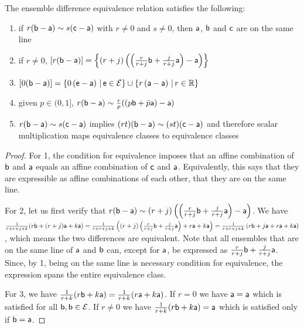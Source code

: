 \begin{mathSection}
	\begin{prop}\label{pm_es_ensDiffProps}
		The ensemble difference equivalence relation satisfies the following:
		\begin{enumerate}
			\item if $r(\ens[b] - \ens[a]) \sim s(\ens[c] - \ens[a])$ with $r\neq0$ and $s\neq0$, then $\ens[a]$, $\ens[b]$ and $\ens[c]$ are on the same line
			\item if $r\neq0$, $[r(\ens[b] - \ens[a])] = \left\{(r+j)\left(\left(\frac{r}{r+j}\ens[b] +\frac{j}{r+j} \ens[a]\right) -\ens[a]\right)\right\}$
			\item $\left[0(\ens[b] - \ens[a])\right] = \left\{0\left(\ens - \ens[a]\right) \, | \, \ens \in \Ens \right\} \cup \left\{r\left(\ens[a] - \ens[a]\right) \, | \, r \in \mathbb{R} \right\}$
			\item given $p \in (0,1]$, $r(\ens[b] - \ens[a]) \sim \frac{r}{p}((p\ens[b] + \bar{p}\ens[a]) - \ens[a])$
			\item $r(\ens[b] - \ens[a]) \sim s(\ens[c] - \ens[a])$ implies $(rt)(\ens[b] - \ens[a]) \sim (st)(\ens[c] - \ens[a])$ and therefore scalar multiplication maps equivalence classes to equivalence classes
		\end{enumerate}
	\end{prop}
	
	\begin{proof}
		For 1, the condition for equivalence imposes that an affine combination of $\ens[b]$ and $\ens[a]$ equals an affine combination of $\ens[c]$ and $\ens[a]$. Equivalently, this says that they are expressible as affine combinations of each other, that they are on the same line.
		
		For 2, let us first verify that $r(\ens[b] - \ens[a]) \sim (r+j)\left(\left(\frac{r}{r+j}\ens[b] +\frac{j}{r+j} \ens[a]\right) -\ens[a]\right)$. We have $\frac{1}{r+r+j+k} (r \ens[b] + (r+j) \ens[a] + k \ens[a]) = \frac{1}{r+r+j+k} \left((r+j)\left(\frac{r}{r+j}\ens[b] +\frac{j}{r+j} \ens[a]\right) + r \ens[a] + k \ens[a]\right)=\frac{1}{r+r+j+k} \left(r\ens[b] +j\ens[a] + r \ens[a] + k \ens[a]\right)$, which means the two differences are equivalent. Note that all ensembles that are on the same line of $\ens[a]$ and $\ens[b]$ can, except for $\ens[a]$, be expressed as $\frac{r}{r+j}\ens[b] +\frac{j}{r+j} \ens[a]$. Since, by 1, being on the same line is necessary condition for equivalence, the expression spans the entire equivalence class.
		
		For 3, we have $\frac{1}{r+k} (r \ens[b] + k \ens[a]) = \frac{1}{r+k} (r \ens[a] + k \ens[a])$. If $r=0$ we have $\ens[a] = \ens[a]$ which is satisfied for all $\ens[b], \ens[b] \in \Ens$. If $r\neq0$ we have $\frac{1}{r+k} (r \ens[b] + k \ens[a]) = \ens[a]$ which is satisfied only if $\ens[b] = \ens[a]$.
		

\end{proof}
\end{mathSection}
